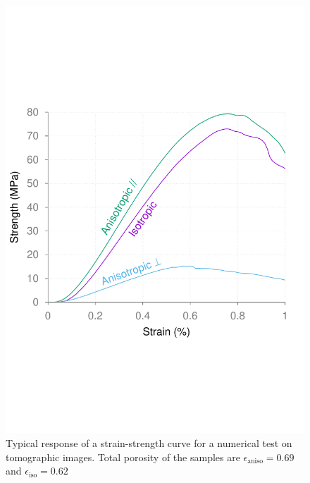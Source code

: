 \documentclass{article}
\begin{document}
	\begin{figure}[ht]
		\centering
		\includegraphics[width=\linewidth]{figures/sup_fig1}
		\caption{Typical response of a strain-strength curve for a numerical test on tomographic images. Total porosity of the samples are $\epsilon_\text{aniso} = 0.69$ and $\epsilon_\text{iso} = 0.62$}
	\end{figure}
\end{document}
